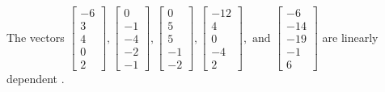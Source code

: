\begin{exercise}
\begin{exerciseStatement}
  \end{exerciseStatement}
  \begin{exerciseAnswer}
   The vectors \(\left[\begin{array}{r}
-6 \\
3 \\
4 \\
0 \\
2
\end{array}\right] , \left[\begin{array}{r}
0 \\
-1 \\
-4 \\
-2 \\
-1
\end{array}\right] , \left[\begin{array}{r}
0 \\
5 \\
5 \\
-1 \\
-2
\end{array}\right] , \left[\begin{array}{r}
-12 \\
4 \\
0 \\
-4 \\
2
\end{array}\right] , \text{ and } \left[\begin{array}{r}
-6 \\
-14 \\
-19 \\
-1 \\
6
\end{array}\right]\) are 
  	 linearly dependent  .
  


  \end{exerciseAnswer}
\end{exercise}